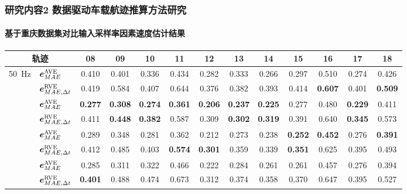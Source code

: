 \begin{frame} 
 	\frametitle{研究内容2 数据驱动车载航迹推算方法研究}
 	\framesubtitle{基于重庆数据集对比输入采样率因素速度估计结果}
    {\footnotesize
    \setlength{\tabcolsep}{2pt}
		\begin{tabular*}{\linewidth}{@{\extracolsep{\fill}}clccccccccccc}
			\toprule
			\multicolumn{2}{c}{轨迹} & 08 & 09 & 10 & 11 & 12 & 13 & 14 & 15 & 16 & 17 & 18 \\
			\midrule
			\multirow{2}{*}{\SI{50}{Hz}} 
			& $\vb*{e}^{\mathrm{AVE}}_{MAE}$ 
			& 0.410 & 0.401 & 0.336 & 0.434 & 0.282 & 0.333 & 0.266 & 0.297 & 0.510 & 0.274 & 0.426 \\
			& $\vb*{e}^{\mathrm{RVE}}_{MAE, \Delta t}$ 
			& 0.419 & 0.584 & 0.407 & 0.644 & 0.376 & 0.382 & 0.393 & 0.414 & \textbf{0.607} & 0.401 & \textbf{0.509} \\ \addlinespace[1mm]
			\multirow{2}{*}{\SI{100}{Hz}} 
			& $\vb*{e}^{\mathrm{AVE}}_{MAE}$ 
			& \textbf{0.277} & \textbf{0.308} & \textbf{0.274} & \textbf{0.361} & \textbf{0.206} & \textbf{0.237} & \textbf{0.225} & 0.277 & 0.480 & \textbf{0.229} & 0.411 \\ 
			& $\vb*{e}^{\mathrm{RVE}}_{MAE, \Delta t}$ 
			& 0.411 & \textbf{0.448} & \textbf{0.382} & 0.587 & 0.309 & \textbf{0.302} & \textbf{0.319} & 0.391 & 0.640 & \textbf{0.345} & 0.573 \\ \addlinespace[1mm]
			\multirow{2}{*}{\SI{150}{Hz}} 
			& $\vb*{e}^{\mathrm{AVE}}_{MAE}$ 
			& 0.289 & 0.348 & 0.281 & 0.362 & 0.212 & 0.273 & 0.238 & \textbf{0.252} & \textbf{0.452} & 0.276 & \textbf{0.391} \\
			& $\vb*{e}^{\mathrm{RVE}}_{MAE, \Delta t}$ 
			& 0.412 & 0.485 & 0.403 & \textbf{0.574} & \textbf{0.301} & 0.359 & 0.339 & \textbf{0.351} & 0.625 & 0.395 & 0.493 \\ \addlinespace[1mm]
			\multirow{2}{*}{\SI{200}{Hz}} 
			& $\vb*{e}^{\mathrm{AVE}}_{MAE}$ 
			& 0.285 & 0.311 & 0.322 & 0.466 & 0.222 & 0.284 & 0.261 & 0.261 & 0.457 & 0.276 & 0.394 \\         
			& $\vb*{e}^{\mathrm{RVE}}_{MAE, \Delta t}$ 
			& \textbf{0.401} & 0.488 & 0.474 & 0.673 & 0.312 & 0.374 & 0.358 & 0.370 & 0.647 & 0.395 & 0.527 \\
			\bottomrule 
		\end{tabular*}
	}	
\end{frame}

